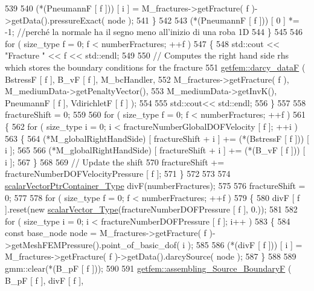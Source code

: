 \begin{DoxyCode}
539 
540             (*(PneumannF [ f ])) [ i ] = M\_fractures->getFracture( f )->getData().pressureExact( node );
541         \}
542 
543         (*(PneumannF [ f ])) [ 0 ] *= -1; \textcolor{comment}{//perché la normale ha il segno meno all'inizio di una roba 1D}
544     \}
545 
546     \textcolor{keywordflow}{for} ( size\_type f = 0; f < numberFractures; ++f )
547     \{
548         std::cout << \textcolor{stringliteral}{"Fracture "} << f << std::endl;
549         
550         \textcolor{comment}{// Computes the right hand side rhs which stores the boundary conditions for the fracture}
551         \hyperlink{namespacegetfem_ad6e90b309c01f6b4fc91c9369cba376a}{getfem::darcy\_dataF} ( BstressF [ f ], B\_vF [ f ], M\_bcHandler,
552                               M\_fractures->getFracture( f ), M\_mediumData->getPenaltyVector(),
553                               M\_mediumData->getInvK(), PneumannF [ f ], VdirichletF [ f ] );
554         
555         std::cout<< std::endl;
556     \}
557 
558     fractureShift = 0;
559     
560     \textcolor{keywordflow}{for} ( size\_type f = 0; f < numberFractures; ++f )
561     \{   
562         \textcolor{keywordflow}{for} ( size\_type i = 0; i < fractureNumberGlobalDOFVelocity [ f ]; ++i )
563         \{   
564             (*M\_globalRightHandSide) [ fractureShift + i ] += (*(BstressF [ f ])) [ i ];
565 
566             (*M\_globalRightHandSide) [ fractureShift + i ] += (*(B\_vF [ f ])) [ i ];
567         \}
568 
569         \textcolor{comment}{// Update the shift}
570         fractureShift += fractureNumberDOFVelocityPressure [ f ];
571     \}
572 
573 
574     \hyperlink{Core_8h_a20f0354ac7b92989514c678f4cdfcb6b}{scalarVectorPtrContainer\_Type} divF(numberFractures);
575 
576     fractureShift = 0;
577     
578     \textcolor{keywordflow}{for} ( size\_type f = 0; f < numberFractures; ++f )
579     \{
580         divF [ f ].reset(\textcolor{keyword}{new} \hyperlink{Core_8h_a4e75b5863535ba1dd79942de2846eff0}{scalarVector\_Type}(fractureNumberDOFPressure [ f ], 0.));
581 
582         \textcolor{keywordflow}{for} ( size\_type i = 0; i < fractureNumberDOFPressure [ f ]; i++ )
583         \{
584             \textcolor{keyword}{const} base\_node node = M\_fractures->getFracture( f )->getMeshFEMPressure().point\_of\_basic\_dof( 
      i );
585 
586             (*(divF [ f ])) [ i ] = M\_fractures->getFracture( f )->getData().darcySource( node );
587         \}
588 
589         gmm::clear(*(B\_pF [ f ]));
590 
591         \hyperlink{namespacegetfem_ac08fe08fb325eede94ffe4968b7980de}{getfem::assembling\_Source\_BoundaryF} ( B\_pF [ f ], divF [ f ], 

\end{DoxyCode}
